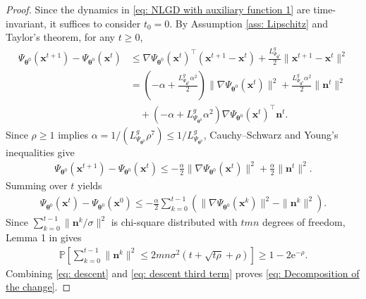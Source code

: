 \documentclass{siamart251216}
\begin{document}
\begin{proof}
    Since the dynamics in \eqref{eq: NLGD with auxiliary function 1} are time-invariant, it suffices to consider $t_{0}=0$. By Assumption \ref{ass: Lipschitz} and Taylor's theorem, for any $t\geq0$,
    \begin{align*}
        \Psi_{\boldsymbol{\theta}^{0}}(\mathbf{x}^{t+1})-\Psi_{\boldsymbol{\theta}^{0}}(\mathbf{x}^{t})
        &\leq \nabla\Psi_{\boldsymbol{\theta}^{0}}(\mathbf{x}^{t})^{\top}(\mathbf{x}^{t+1}-\mathbf{x}^{t})+\frac{L_{\Psi_{\boldsymbol{\theta}^{0}}}^{g}}{2}\|\mathbf{x}^{t+1}-\mathbf{x}^{t}\|^{2}\\
        &=\left(-\alpha+\frac{L_{\Psi_{\boldsymbol{\theta}^{0}}}^{g}\alpha^{2}}{2}\right)\|\nabla\Psi_{\boldsymbol{\theta}^{0}}(\mathbf{x}^{t})\|^{2}+\frac{L_{\Psi_{\boldsymbol{\theta}^{0}}}^{g}\alpha^{2}}{2}\|\mathbf{n}^{t}\|^{2}\\
        &\quad+\left(-\alpha+L_{\Psi_{\boldsymbol{\theta}^{0}}}^{g}\alpha^{2}\right)\nabla\Psi_{\boldsymbol{\theta}^{0}}(\mathbf{x}^{t})^{\top}\mathbf{n}^{t}.
    \end{align*}
    Since $\rho\geq1$ implies $\alpha=1/(L_{\Psi_{\boldsymbol{\theta}^{0}}}^{g}\rho^{7})\leq1/L_{\Psi_{\boldsymbol{\theta}^{0}}}^{g}$, Cauchy--Schwarz and Young's inequalities give
    \begin{gather*}
        \Psi_{\boldsymbol{\theta}^{0}}(\mathbf{x}^{t+1})-\Psi_{\boldsymbol{\theta}^{0}}(\mathbf{x}^{t})\leq-\frac{\alpha}{2}\|\nabla\Psi_{\boldsymbol{\theta}^{0}}(\mathbf{x}^{t})\|^{2}+\frac{\alpha}{2}\|\mathbf{n}^{t}\|^{2}.
    \end{gather*}
    Summing over $t$ yields
    \begin{gather}
    \label{eq: descent}
        \Psi_{\boldsymbol{\theta}^{0}}(\mathbf{x}^{t})-\Psi_{\boldsymbol{\theta}^{0}}(\mathbf{x}^{0})\leq-\frac{\alpha}{2}\sum_{k=0}^{t-1}\left(\|\nabla\Psi_{\boldsymbol{\theta}^{0}}(\mathbf{x}^{k})\|^{2}-\|\mathbf{n}^{k}\|^{2}\right).
    \end{gather}
    Since $\sum_{k=0}^{t-1}\|\mathbf{n}^{k}/\sigma\|^{2}$ is chi-square distributed with $tmn$ degrees of freedom, Lemma 1 in \cite{laurent2000adaptive} gives
    \begin{gather}
    \label{eq: descent third term}
        \mathbb{P}\left[\sum_{k=0}^{t-1}\|\mathbf{n}^{k}\|^{2}\leq2mn\sigma^{2}(t+\sqrt{t\rho}+\rho)\right]\geq1-2\mathrm{e}^{-\rho}.
    \end{gather}
    Combining \eqref{eq: descent} and \eqref{eq: descent third term} proves \eqref{eq: Decomposition of the change}.
\end{proof}
\end{document}
